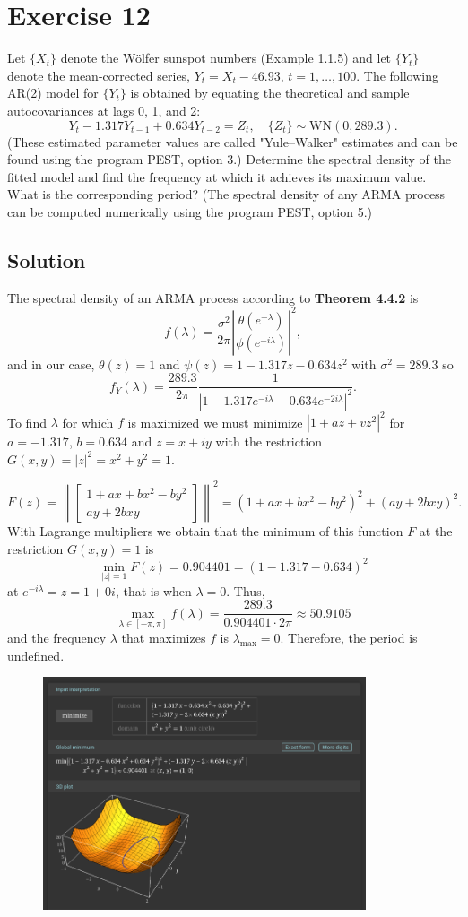 \section*{Exercise 12}

Let \(\{X_t\}\) denote the Wölfer sunspot numbers (Example 1.1.5) and let \(\{Y_t\}\) denote the mean-corrected series, \(Y_t = X_t - 46.93, \, t = 1, \ldots, 100\). The following AR(2) model for \(\{Y_t\}\) is obtained by equating the theoretical and sample autocovariances 
at lags 0, 1, and 2:
\[
Y_t - 1.317Y_{t-1} + 0.634Y_{t-2} = Z_t, \quad \{Z_t\} \sim \mathrm{WN}(0, 289.3).
\]
(These estimated parameter values are called "Yule–Walker" estimates and can 
be found using the program PEST, option 3.)
Determine the spectral density of the fitted model and find the frequency at 
which it achieves its maximum value. What is the corresponding period? 
(The spectral density of any ARMA process can be computed numerically using the 
program PEST, option 5.)

\subsection*{Solution}

The spectral density of an ARMA process according to\textbf{ Theorem 4.4.2} is 
\[ f(\lambda) = \frac{\sigma^2}{2\pi} \left| \frac{\theta(e^{-\lambda})}{\phi(e^{-i\lambda})} \right|^2 ,\]
and in our case, $\theta(z) = 1$ and $\psi(z) = 1 - 1.317z-0.634z^2$ with $\sigma^2 = 289.3$ so
\[ f_Y(\lambda) = \frac{289.3}{2\pi} \frac{1}{|1 - 1.317 e^{-i\lambda} - 0.634 e^{-2i\lambda}|^2}. \]
To find $\lambda$ for which $f$ is maximized we must minimize $|1 + a z + v z^2|^2$ for $a = -1.317$, $b = 0.634$ and $z = x+iy$ with the restriction $G(x,y) = |z|^2 = x^2+y^2 = 1$.

\[ F(z) = \left\| \begin{bmatrix}
    1 + ax + bx^2 - by^2\\
    ay + 2bxy
\end{bmatrix} \right\|^2 = (1+ax+bx^2 -by^2)^2 + (ay + 2bxy)^2.
\]
With Lagrange multipliers we obtain that the minimum of this function $F$ at the restriction $G(x,y) = 1$ is
\[ \min_{|z| = 1}F(z) = 0.904401 = (1 - 1.317 - 0.634)^2 \]
at $e^{-i\lambda} = z = 1+0i$, that is when $\lambda = 0$. Thus, 
\[ \max_{\lambda \in [-\pi,\pi]}f(\lambda) = \frac{289.3}{0.904401\cdot 2\pi} \approx 50.9105\]
and the frequency $\lambda$ that maximizes $f$ is $\lambda_{\max} = 0$. Therefore, the period is undefined.

\begin{figure}[H]
    \centering
    \includegraphics[width=0.85\textwidth]{../pictures/image1.png}
\end{figure}